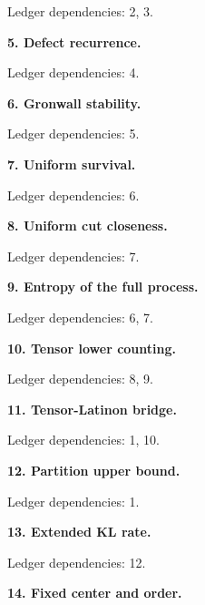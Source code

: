 \documentclass[english,11pt,a4paper]{article}
\begin{document}

Ledger dependencies: 2, 3.

\textbf{5. Defect recurrence.}


Ledger dependencies: 4.

\textbf{6. Gronwall stability.}


Ledger dependencies: 5.

\textbf{7. Uniform survival.}


Ledger dependencies: 6.

\textbf{8. Uniform cut closeness.}


Ledger dependencies: 7.

\textbf{9. Entropy of the full process.}


Ledger dependencies: 6, 7.

\textbf{10. Tensor lower counting.}


Ledger dependencies: 8, 9.

\textbf{11. Tensor-Latinon bridge.}


Ledger dependencies: 1, 10.

\textbf{12. Partition upper bound.}


Ledger dependencies: 1.

\textbf{13. Extended KL rate.}


Ledger dependencies: 12.

\textbf{14. Fixed center and order.}
\end{document}

